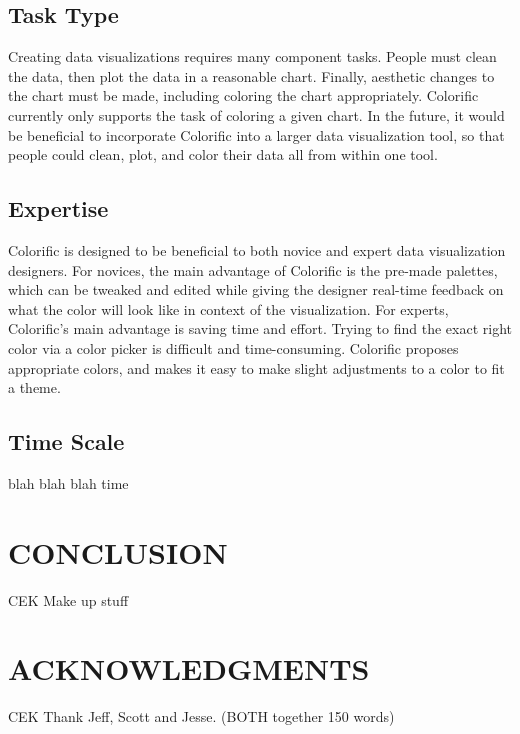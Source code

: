 \documentclass{article}
\newcommand{\system}{Colorific\xspace}
\begin{document}
\subsection{Task Type}
Creating data visualizations requires many component tasks. People must clean the data, then plot the data in a reasonable chart. Finally, aesthetic changes to the chart must be made, including coloring the chart appropriately. \system currently only supports the task of coloring a given chart. In the future, it would be beneficial to incorporate \system into a larger data visualization tool, so that people could clean, plot, and color their data all from within one tool. 

\subsection{Expertise}
\system is designed to be beneficial to both novice and expert data visualization designers. For novices, the main advantage of \system is the pre-made palettes, which can be tweaked and edited while giving the designer real-time feedback on what the color will look like in context of the visualization. For experts, \system's main advantage is saving time and effort. Trying to find the exact right color via a color picker is difficult and time-consuming. \system proposes appropriate colors, and makes it easy to make slight adjustments to a color to fit a theme. 

\subsection{Time Scale}
blah blah blah time

\section{CONCLUSION}
CEK Make up stuff

\section{ACKNOWLEDGMENTS} 
CEK Thank Jeff, Scott and Jesse.
(BOTH together 150 words)





\end{document}
